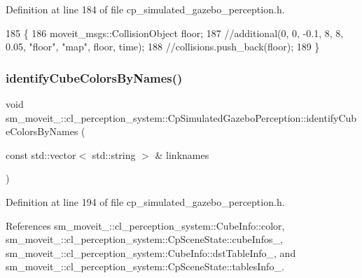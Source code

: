 Definition at line 184 of file cp\+\_\+simulated\+\_\+gazebo\+\_\+perception.\+h.


\begin{DoxyCode}
185             \{
186                 moveit\_msgs::CollisionObject floor;
187                 \textcolor{comment}{//additional(0, 0, -0.1, 8, 8, 0.05, "floor", "map", floor, time);}
188                 \textcolor{comment}{//collisions.push\_back(floor);}
189             \}
\end{DoxyCode}
\mbox{\label{classsm__moveit__4_1_1cl__perception__system_1_1CpSimulatedGazeboPerception_aac02fd742b0074f62d8909ce00a02d3b}} 
\subsubsection{\texorpdfstring{identify\+Cube\+Colors\+By\+Names()}{identifyCubeColorsByNames()}}
{\footnotesize\ttfamily void sm\+\_\+moveit\+\_\+::cl\+\_\+perception\+\_\+system\+::\+Cp\+Simulated\+Gazebo\+Perception\+::identify\+Cube\+Colors\+By\+Names (\begin{DoxyParamCaption}\item[{const std\+::vector$<$ std\+::string $>$ \&}]{linknames }\end{DoxyParamCaption})\hspace{0.3cm}{\ttfamily [inline]}}



Definition at line 194 of file cp\+\_\+simulated\+\_\+gazebo\+\_\+perception.\+h.



References sm\+\_\+moveit\+\_\+::cl\+\_\+perception\+\_\+system\+::\+Cube\+Info\+::color, sm\+\_\+moveit\+\_\+::cl\+\_\+perception\+\_\+system\+::\+Cp\+Scene\+State\+::cube\+Infos\+\_\+, sm\+\_\+moveit\+\_\+::cl\+\_\+perception\+\_\+system\+::\+Cube\+Info\+::dst\+Table\+Info\+\_\+, and sm\+\_\+moveit\+\_\+::cl\+\_\+perception\+\_\+system\+::\+Cp\+Scene\+State\+::tables\+Info\+\_\+.


